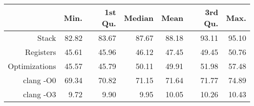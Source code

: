 \begin{table}[ht]
\centering
\begin{tabular}{rrrrrrr}
  \hline
 & Min. & 1st Qu. & Median & Mean & 3rd Qu. & Max. \\ 
  \hline
Stack & 82.82 & 83.67 & 87.67 & 88.18 & 93.11 & 95.10 \\ 
  Registers & 45.61 & 45.96 & 46.12 & 47.45 & 49.45 & 50.76 \\ 
  Optimizations & 45.57 & 45.79 & 50.11 & 49.91 & 51.98 & 57.48 \\ 
  clang -O0 & 69.34 & 70.82 & 71.15 & 71.64 & 71.77 & 74.89 \\ 
  clang -O3 & 9.72 & 9.90 & 9.95 & 10.05 & 10.26 & 10.43 \\ 
   \hline
\end{tabular}
\end{table}
